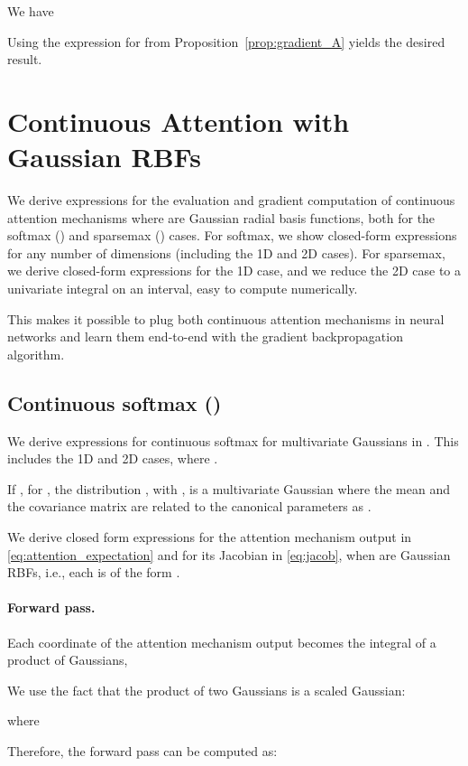 \documentclass{article}
\begin{document}
We have

Using the expression for  from Proposition~\ref{prop:gradient_A} yields the desired result.


\section{Continuous Attention with Gaussian RBFs}\label{sec:gaussian_basis}

We derive expressions for the evaluation and gradient computation of  continuous attention mechanisms where  are Gaussian radial basis functions, both for the softmax () and sparsemax () cases. 
For softmax, we show closed-form expressions for any number of dimensions (including the 1D and 2D cases). 
For sparsemax, we derive closed-form expressions for the 1D case, and we reduce the 2D case to a univariate integral on an interval, easy to compute numerically. 

This makes it possible to plug both continuous attention mechanisms in neural networks and learn them end-to-end with the gradient backpropagation algorithm.


\subsection{Continuous softmax ()}

We derive expressions for continuous softmax for multivariate Gaussians in .  
This includes the 1D and 2D cases, where . 

If , for , the distribution , with , is a multivariate Gaussian where the mean  and the covariance matrix  are related to the canonical parameters as . 

We derive closed form expressions for the attention mechanism output 
 in \eqref{eq:attention_expectation} and for its Jacobian  in \eqref{eq:jacob},  when  are Gaussian RBFs, i.e., each  is of the form . 

\paragraph{Forward pass.}

Each coordinate of the attention mechanism output becomes the integral of a product of Gaussians,


We use the fact that the product of two Gaussians is a scaled Gaussian:

where 

Therefore, the forward pass can be computed as:
\end{document}
